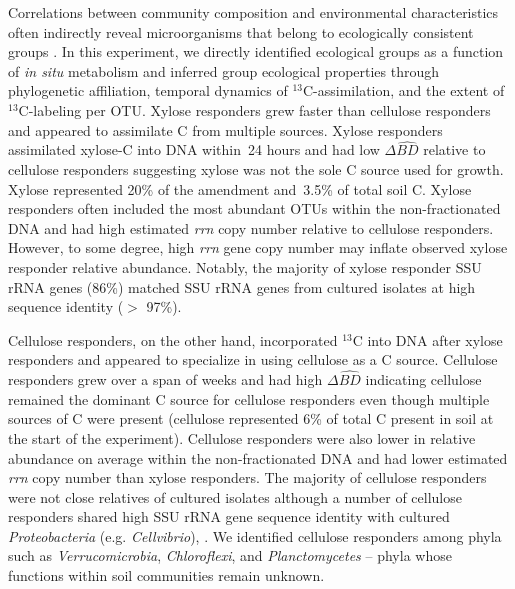 Correlations between community composition and environmental characteristics
often indirectly reveal microorganisms that belong to ecologically consistent
groups \citep{Fierer2007}. In this experiment, we directly identified
ecological groups as a function of \textit{in situ} metabolism and inferred
group ecological properties through phylogenetic affiliation, temporal dynamics
of $^{13}$C-assimilation, and the extent of $^{13}$C-labeling per OTU. Xylose
responders grew faster than cellulose responders and appeared to assimilate
C from multiple sources. Xylose responders assimilated xylose-C into DNA
within~24 hours and had low $\Delta\hat{BD}$ relative to cellulose responders
suggesting xylose was not the sole C source used for growth. Xylose represented
20\% of the amendment and~3.5\% of total soil C. Xylose responders often
included the most abundant OTUs within the non-fractionated DNA and had high
estimated \textit{rrn} copy number relative to cellulose responders. However,
to some degree, high \textit{rrn} gene copy number may inflate observed xylose
responder relative abundance. Notably, the majority of xylose responder SSU
rRNA genes (86\%) matched SSU rRNA genes from cultured isolates at high
sequence identity ($>$ 97\%). 

Cellulose responders, on the other hand, incorporated $^{13}$C into DNA after
xylose responders and appeared to specialize in using cellulose as a C source.
Cellulose responders grew over a span of weeks and had high $\Delta\hat{BD}$
indicating cellulose remained the dominant C source for cellulose responders
even though multiple sources of C were present (cellulose represented 6\% of
total C present in soil at the start of the experiment). Cellulose responders
were also lower in relative abundance on average within the non-fractionated
DNA and had lower estimated \textit{rrn} copy number than xylose responders.
The majority of cellulose responders were not close relatives of cultured
isolates although a number of cellulose responders shared high SSU rRNA gene
sequence identity with cultured \textit{Proteobacteria} (e.g.
\textit{Cellvibrio}), . We identified cellulose responders among phyla such as
\textit{Verrucomicrobia}, \textit{Chloroflexi}, and \textit{Planctomycetes} --
phyla whose functions within soil communities remain unknown.


